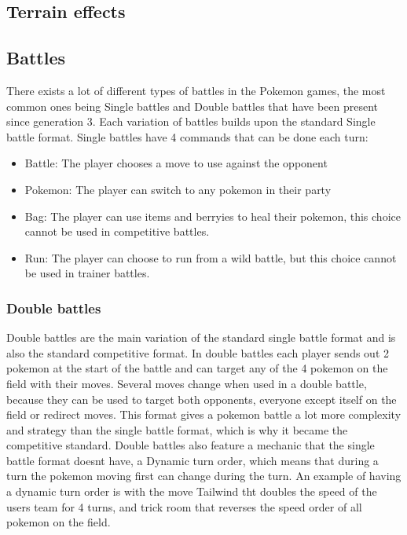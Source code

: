 \subsection{Terrain effects}


\subsection{Battles}
There exists a lot of different types of battles in the Pokemon games, the most common ones being Single battles and Double battles that have been present 
since generation 3. Each variation of battles builds upon the standard Single battle format. Single battles have 4 commands that can be done each turn:
\cite{PokemonBattles}
\begin{itemize}
  \item Battle: The player chooses a move to use against the opponent
  \item Pokemon: The player can switch to any pokemon in their party 
  \item Bag: The player can use items and berryies to heal their pokemon, this choice cannot be used in competitive battles.
  \item Run: The player can choose to run from a wild battle, but this choice cannot be used in trainer battles.
\end{itemize}
\subsubsection{Double battles}
Double battles are the main variation of the standard single battle format and is also the standard competitive format. In double battles 
each player sends out 2 pokemon at the start of the battle and can target any of the 4 pokemon on the field with their moves. Several moves change 
when used in a double battle, because they can be used to target both opponents, everyone except itself on the field or redirect moves.
This format gives a pokemon battle a lot more complexity and strategy than the single battle format, which is why it became the competitive standard.
Double battles also feature a mechanic that the single battle format doesnt have, a Dynamic turn order, which means that during a turn the pokemon
moving first can change during the turn. An example of having a dynamic turn order is with the move Tailwind tht doubles the speed of the users team for 
4 turns, and trick room that reverses the speed order of all pokemon on the field. \cite{PokemonBattles}

